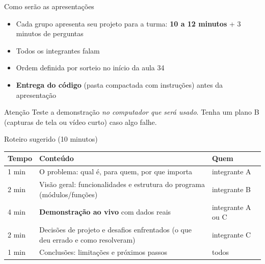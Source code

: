 \documentclass[aspectratio=169,10pt,t]{beamer}
\begin{document}
\capa

\begin{frame}{Como serão as apresentações}
  \begin{itemize}
    \item Cada grupo apresenta seu projeto para a turma: \textbf{10 a 12 minutos} + 3 minutos de perguntas
    \item Todos os integrantes falam
    \item Ordem definida por sorteio no início da aula 34
    \item \textbf{Entrega do código} (pasta compactada com instruções) antes da apresentação
  \end{itemize}
  \begin{alertblock}{Atenção}
    Teste a demonstração \emph{no computador que será usado}. Tenha um plano B (capturas de tela ou vídeo curto) caso algo falhe.
  \end{alertblock}
\end{frame}

\begin{frame}{Roteiro sugerido (10 minutos)}
  \centering\small
  \begin{tabular}{p{1.3cm}p{7.4cm}p{2.6cm}}
    \toprule
    \textbf{Tempo} & \textbf{Conteúdo} & \textbf{Quem}\\
    \midrule
    1 min & O problema: qual é, para quem, por que importa & integrante A\\
    2 min & Visão geral: funcionalidades e estrutura do programa (módulos/funções) & integrante B\\
    4 min & \textbf{Demonstração ao vivo} com dados reais & integrante A ou C\\
    2 min & Decisões de projeto e desafios enfrentados (o que deu errado e como resolveram) & integrante C\\
    1 min & Conclusões: limitações e próximos passos & todos\\
    \bottomrule
  \end{tabular}
\end{frame}
\end{document}
